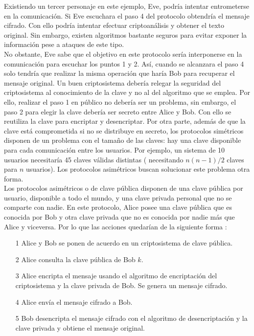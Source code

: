 \documentclass[../PFC.tex]{subfiles}
\begin{document}
Existiendo un tercer personaje en este ejemplo, Eve, podría intentar entrometerse en la comunicación. Si Eve escuchara el paso 4 del protocolo obtendría el mensaje cifrado. Con ello podría intentar efectuar criptoanálisis y obtener el texto original. Sin embargo, existen algoritmos bastante seguros para evitar exponer la información pese a ataques de este tipo.
\*
\vspace{0.5515cm}
\\
No obstante, Eve sabe que el objetivo en este protocolo sería interponerse en la comunicación para escuchar los puntos 1 y 2. Así, cuando se alcanzara el paso 4 solo tendría que realizar la misma operación que haría Bob para recuperar el mensaje original. Un buen criptosistema debería relegar la seguridad del criptosistema al conocimiento de la clave y no al del algoritmo que se emplea. Por ello, realizar el paso 1 en público no debería ser un problema, sin embargo, el paso 2 para elegir la clave debería ser secreto entre Alice y Bob. Con ello se reutiliza la clave para encriptar y desencriptar. Por otra parte, además de que la clave está comprometida si no se distribuye en secreto, los protocolos simétricos disponen de un problema con el tamaño de las claves: hay una clave disponible para cada comunicación entre los usuarios. Por ejemplo, un sistema de 10 usuarios necesitaría 45 claves válidas distintas ( necesitando $n(n-1)/2$ claves para $n$ usuarios).
Los protocolos asimétricos buscan solucionar este problema otra forma.
\*
\vspace{0.5515cm}
\\
Los protocolos asimétricos o de clave pública disponen de una clave pública por usuario, disponible a todo el mundo, y una clave privada personal que no se comparte con nadie. En este protocolo, Alice posee una clave pública que es conocida por Bob y otra clave privada que no es conocida por nadie más que Alice y viceversa. Por lo que las acciones quedarían de la siguiente forma :

\begin{itemize}
\item[1]{Alice y Bob se ponen de acuerdo en un criptosistema de clave pública.}
\item[2]{Alice consulta la clave pública de Bob $k$.}
\item[3]{Alice encripta el mensaje usando el algoritmo de encriptación del criptosistema y la clave privada de Bob. Se genera un mensaje cifrado.}
\item[4]{Alice envía el mensaje cifrado a Bob.}
\item[5]{Bob desencripta el mensaje cifrado con el algoritmo de desencriptación y la clave privada y obtiene el mensaje original.}
\end{itemize}
\end{document}
